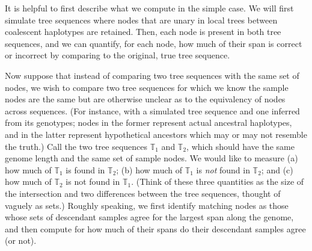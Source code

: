 \documentclass[10pt,twoside,lineno]{gsajnl}
\newcommand{\T}{\mathbb{T}}
\begin{document}
It is helpful to first describe what we compute in the simple case.
We will first simulate tree sequences where
nodes that are unary in local trees between coalescent haplotypes are retained.
Then, each node is present in both tree sequences,
and we can quantify, for each node, how much of their span is correct or incorrect
by comparing to the original, true tree sequence.

Now suppose that instead of comparing two tree sequences with the same set of nodes,
we wish to compare two tree sequences for which we know the sample nodes are the same
but are otherwise unclear as to the equivalency of nodes across sequences.
(For instance, with a simulated tree sequence and one inferred from its genotypes;
nodes in the former represent actual ancestral haplotypes, and in the latter
represent hypothetical ancestors which may or may not resemble the truth.)
Call the two tree sequences $\T_1$ and $\T_2$, which should have the same genome length
and the same set of sample nodes.
We would like to measure (a) how much of $\T_1$ is found in $\T_2$;
(b) how much of $\T_1$ is \emph{not} found in $\T_2$; and
(c) how much of $\T_2$ is not found in $\T_1$.
(Think of these three quantities as the size of the intersection
and two differences between the tree sequences,
thought of vaguely as sets.)
Roughly speaking, we first identify matching nodes
as those whose sets of descendant samples agree for the largest span along the genome,
and then compute for how much of their spans do their descendant samples agree (or not).
\end{document}
